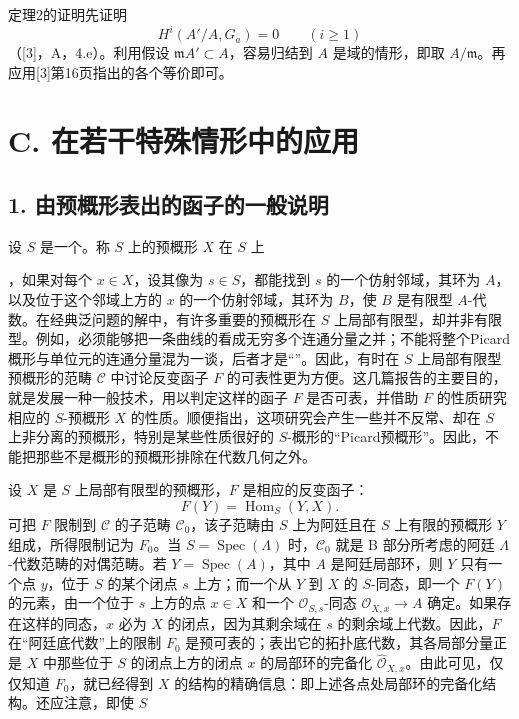 定理2的证明先证明
\[
 H^i(A'/A,G_a)=0\qquad(i\geq1)
\]
（[3]，A，4.e）。利用假设 $\mathfrak mA'\subset A$，容易归结到 $A$ 是域的情形，即取 $A/\mathfrak m$。再应用[3]第16页指出的各个等价即可。

\section*{C. 在若干特殊情形中的应用}
\subsection*{1. 由预概形表出的函子的一般说明}
设 $S$ 是一个。称 $S$ 上的预概形 $X$ 在 $S$ 上

，如果对每个 $x\in X$，设其像为 $s\in S$，都能找到 $s$ 的一个仿射邻域，其环为 $A$，以及位于这个邻域上方的 $x$ 的一个仿射邻域，其环为 $B$，使 $B$ 是有限型 $A$-代数。在经典泛问题的解中，有许多重要的预概形在 $S$ 上局部有限型，却并非有限型。例如，必须能够把一条曲线的看成无穷多个连通分量之并；不能将整个Picard概形与单位元的连通分量混为一谈，后者才是“”。因此，有时在 $S$ 上局部有限型预概形的范畴 $\mathcal C$ 中讨论反变函子 $F$ 的可表性更为方便。这几篇报告的主要目的，就是发展一种一般技术，用以判定这样的函子 $F$ 是否可表，并借助 $F$ 的性质研究相应的 $S$-预概形 $X$ 的性质。顺便指出，这项研究会产生一些并不反常、却在 $S$ 上非分离的预概形，特别是某些性质很好的 $S$-概形的“Picard预概形”。因此，不能把那些不是概形的预概形排除在代数几何之外。

设 $X$ 是 $S$ 上局部有限型的预概形，$F$ 是相应的反变函子：
\[
 F(Y)=\operatorname{Hom}_S(Y,X).
\]
可把 $F$ 限制到 $\mathcal C$ 的子范畴 $\mathcal C_0$，该子范畴由 $S$ 上为阿廷且在 $S$ 上有限的预概形 $Y$ 组成，所得限制记为 $F_0$。当 $S=\operatorname{Spec}(\Lambda)$ 时，$\mathcal C_0$ 就是 B 部分所考虑的阿廷 $\Lambda$-代数范畴的对偶范畴。若 $Y=\operatorname{Spec}(A)$，其中 $A$ 是阿廷局部环，则 $Y$ 只有一个点 $y$，位于 $S$ 的某个闭点 $s$ 上方；而一个从 $Y$ 到 $X$ 的 $S$-同态，即一个 $F(Y)$ 的元素，由一个位于 $s$ 上方的点 $x\in X$ 和一个 $\mathcal O_{S,s}$-同态 $\mathcal O_{X,x}\to A$ 确定。如果存在这样的同态，$x$ 必为 $X$ 的闭点，因为其剩余域在 $s$ 的剩余域上代数。因此，$F$ 在“阿廷底代数”上的限制 $F_0$ 是预可表的；表出它的拓扑底代数，其各局部分量正是 $X$ 中那些位于 $S$ 的闭点上方的闭点 $x$ 的局部环的完备化 $\widehat{\mathcal O}_{X,x}$。由此可见，仅仅知道 $F_0$，就已经得到 $X$ 的结构的精确信息：即上述各点处局部环的完备化结构。还应注意，即使 $S$

